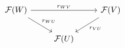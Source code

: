 \documentclass[12pt]{standalone}
\begin{document}
        $$

\begin{tikzcd}
\mathcal F(W) \ar[rr,"r_{WV}"] \ar[rd,"r_{WU}"] & & 
\mathcal F(V) \ar[ld,"r_{VU}"] \\
& \mathcal F(U) & 
\end{tikzcd} 
        $$
        
\end{document}
